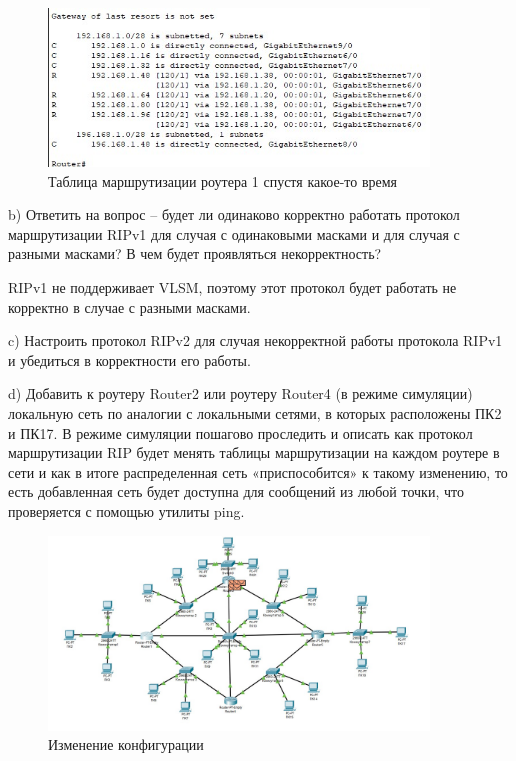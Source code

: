 \documentclass[bachelor, och, labwork]{shiza}
\begin{document}
\begin{enumerate}
    \begin{figure}[H]
        \centering      %
        \includegraphics[width=0.9\textwidth]{5}
        \caption{Таблица маршрутизации роутера 1 спустя какое-то время}
        \label{fig:image1}
    \end{figure}

    b) Ответить на вопрос – будет ли одинаково корректно работать протокол маршрутизации RIPv1 для случая с одинаковыми масками 
    и для случая с разными масками? В чем будет проявляться некорректность?
    
    RIPv1 не поддерживает VLSM, поэтому этот протокол будет работать не корректно в случае с разными масками.

    c) Настроить протокол RIPv2 для случая некорректной работы протокола RIPv1 и убедиться в корректности его работы.

    d) Добавить к роутеру Router2 или роутеру Router4 (в режиме симуляции) локальную сеть по аналогии с локальными сетями, в которых 
    расположены ПК2 и ПК17. В режиме симуляции пошагово проследить и описать как протокол маршрутизации RIP будет менять таблицы маршрутизации 
    на каждом роутере в сети и как в итоге распределенная сеть «приспособится» к такому изменению, то есть добавленная сеть будет доступна для 
    сообщений из любой точки, что проверяется с помощью утилиты ping.

    \begin{figure}[H]
        \centering      %
        \includegraphics[width=0.9\textwidth]{7}
        \caption{Изменение конфигурации}
        \label{fig:image1}
    \end{figure}


\end{enumerate}
\end{document}

